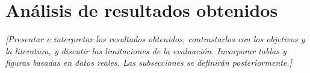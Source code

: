 \chapter{Análisis de resultados obtenidos}
\label{cap:resultados}

\textit{[Presentar e interpretar los resultados obtenidos, contrastarlos con los
objetivos y la literatura, y discutir las limitaciones de la evaluación.
Incorporar tablas y figuras basadas en datos reales. Las subsecciones se
definirán posteriormente.]}
